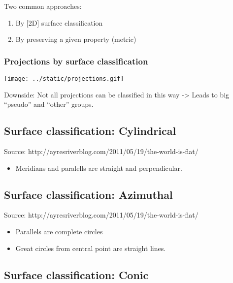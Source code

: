 \documentclass[11pt]{article}
\makeatletter
\def\maxwidth{\ifdim\Gin@nat@width>\linewidth\linewidth
    \else\Gin@nat@width\fi}
\let\Oldincludegraphics\includegraphics
\renewcommand{\includegraphics}[1]{\Oldincludegraphics[width=.8\maxwidth]{#1}}
\providecommand{\tightlist}{%
      \setlength{\itemsep}{0pt}\setlength{\parskip}{0pt}}
\makeatother
\begin{document}
Two common approaches:

\begin{enumerate}
\def\labelenumi{\arabic{enumi}.}
\tightlist
\item
  By {[}2D{]} surface classification
\item
  By preserving a given property (metric)
\end{enumerate}

    \hypertarget{projections-by-surface-classification}{%
\subsubsection{Projections by surface
classification}\label{projections-by-surface-classification}}

\texttt{[image: ../static/projections.gif]}

Downside: Not all projections can be classified in this way
-\textgreater{} Leads to big ``pseudo'' and ``other'' groups.

    \hypertarget{surface-classification-cylindrical}{%
\subsection{Surface classification:
Cylindrical}\label{surface-classification-cylindrical}}

Source: http://ayresriverblog.com/2011/05/19/the-world-is-flat/

\begin{itemize}
\tightlist
\item
  Meridians and paralells are straight and perpendicular.
\end{itemize}

    \hypertarget{surface-classification-azimuthal}{%
\subsection{Surface classification:
Azimuthal}\label{surface-classification-azimuthal}}

Source: http://ayresriverblog.com/2011/05/19/the-world-is-flat/

\begin{itemize}
\tightlist
\item
  Parallels are complete circles
\item
  Great circles from central point are straight lines.
\end{itemize}

    \hypertarget{surface-classification-conic}{%
\subsection{Surface classification:
Conic}\label{surface-classification-conic}}
\end{document}
